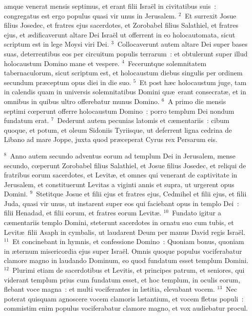 \bchapter
{}amque venerat mensis septimus, et erant filii Isra\"el in civitatibus suis~: congregatus est ergo populus quasi vir unus in Jerusalem.
${}^{2}$~Et surrexit Josue filius Josedec, et fratres ejus sacerdotes, et Zorobabel filius Salathiel, et fratres ejus, et \ae dificaverunt altare Dei Isra\"el ut offerrent in eo holocautomata, sicut scriptum est in lege Moysi viri Dei.
${}^{3}$~Collocaverunt autem altare Dei super bases suas, deterrentibus eos per circuitum populis terrarum~: et obtulerunt super illud holocaustum Domino mane et vespere.
${}^{4}$~Feceruntque solemnitatem tabernaculorum, sicut scriptum est, et holocaustum diebus singulis per ordinem secundum pr\ae ceptum opus diei in die suo.
${}^{5}$~Et post h\ae c holocaustum juge, tam in calendis quam in universis solemnitatibus Domini qu\ae\ erant consecrat\ae , et in omnibus in quibus ultro offerebatur munus Domino.
${}^{6}$~A primo die mensis septimi cœperunt offerre holocaustum Domino~: porro templum Dei nondum fundatum erat.
${}^{7}$~Dederunt autem pecunias latomis et c\ae mentariis~: cibum quoque, et potum, et oleum Sidoniis Tyriisque, ut deferrent ligna cedrina de Libano ad mare Joppe, juxta quod pr\ae ceperat Cyrus rex Persarum eis.


${}^{8}$~Anno autem secundo adventus eorum ad templum Dei in Jerusalem, mense secundo, cœperunt Zorobabel filius Salathiel, et Josue filius Josedec, et reliqui de fratribus eorum sacerdotes, et Levit\ae , et omnes qui venerant de captivitate in Jerusalem, et constituerunt Levitas a viginti annis et supra, ut urgerent opus Domini.
${}^{9}$~Stetitque Josue et filii ejus et fratres ejus, Cedmihel et filii ejus, et filii Juda, quasi vir unus, ut instarent super eos qui faciebant opus in templo Dei~: filii Henadad, et filii eorum, et fratres eorum Levit\ae .
${}^{10}$~Fundato igitur a c\ae mentariis templo Domini, steterunt sacerdotes in ornatu suo cum tubis, et Levit\ae\ filii Asaph in cymbalis, ut laudarent Deum per manus David regis Isra\"el.
${}^{11}$~Et concinebant in hymnis, et confessione Domino~: Quoniam bonus, quoniam in \ae ternum misericordia ejus super Isra\"el. Omnis quoque populus vociferabatur clamore magno in laudando Dominum, eo quod fundatum esset templum Domini.
${}^{12}$~Plurimi etiam de sacerdotibus et Levitis, et principes patrum, et seniores, qui viderant templum prius cum fundatum esset, et hoc templum, in oculis eorum, flebant voce magna~: et multi vociferantes in l\ae titia, elevabant vocem.
${}^{13}$~Nec poterat quisquam agnoscere vocem clamoris l\ae tantium, et vocem fletus populi~: commistim enim populus vociferabatur clamore magno, et vox audiebatur procul.

